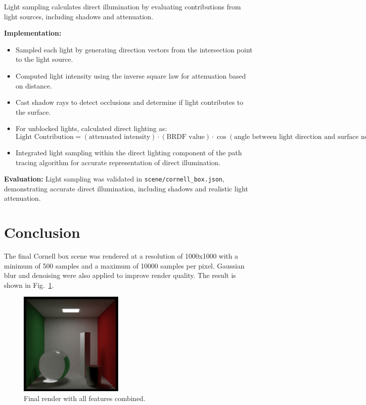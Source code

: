 \documentclass[11pt,a4paper]{article}
\begin{document}
Light sampling calculates direct illumination by evaluating contributions from light sources, including shadows and attenuation.

\noindent\textbf{Implementation:}  
\begin{itemize}
    \item Sampled each light by generating direction vectors from the intersection point to the light source.  
    \item Computed light intensity using the inverse square law for attenuation based on distance.  
    \item Cast shadow rays to detect occlusions and determine if light contributes to the surface.  
    \item For unblocked lights, calculated direct lighting as:  
    \[
    \text{Light Contribution} = (\text{attenuated intensity}) \cdot (\text{BRDF value}) \cdot \cos(\text{angle between light direction and surface normal})
    \]
    \item Integrated light sampling within the direct lighting component of the path tracing algorithm for accurate representation of direct illumination.  
\end{itemize}

\noindent\textbf{Evaluation:}  
Light sampling was validated in \texttt{scene/cornell\_box.json}, demonstrating accurate direct illumination, including shadows and realistic light attenuation.  

\section{Conclusion}
\label{sec:conclusion}

The final Cornell box scene was rendered at a resolution of 1000x1000 with a minimum of 500 samples and a maximum of 10000 samples per pixel. Gaussian blur and denoising were also applied to improve render quality. The result is shown in Fig.~\ref{fig:features_combined}.

\begin{figure}[h!]
    \centering
    \includegraphics[width=0.45\textwidth]{1000x1000.png}
    \caption{Final render with all features combined.}
    \label{fig:features_combined}
\end{figure}
\end{document}
